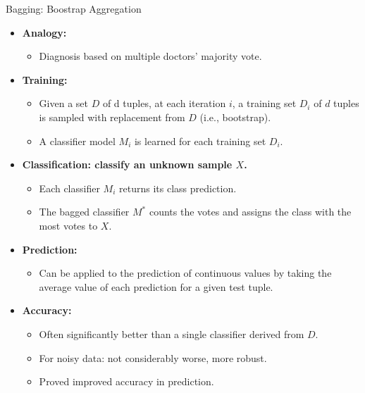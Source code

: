 \begin{frame}{Bagging: Boostrap Aggregation}
	\begin{itemize}
		\item \textbf{Analogy:}
		      \begin{itemize}
			      \item Diagnosis based on multiple doctors' majority vote.
		      \end{itemize}
		\item \textbf{Training:}
		      \begin{itemize}
			      \item Given a set $D$ of d tuples, at each iteration $i$, a training set $D_i$ of $d$ tuples is sampled with replacement from $D$ (i.e., bootstrap).
			      \item A classifier model $M_i$ is learned for each training set $D_i$.
		      \end{itemize}
		\item \textbf{Classification: classify an unknown sample $X$.}
		      \begin{itemize}
			      \item Each classifier $M_i$ returns its class prediction.
			      \item The bagged classifier $M^*$ counts the votes and assigns the class with the most votes to $X$.
		      \end{itemize}
		\item \textbf{Prediction:}
		      \begin{itemize}
			      \item Can be applied to the prediction of continuous values by taking the average value of each prediction for a given test tuple.
		      \end{itemize}
		\item \textbf{Accuracy:}
		      \begin{itemize}
			      \item Often significantly better than a single classifier derived from $D$.
			      \item For noisy data: not considerably worse, more robust.
			      \item Proved improved accuracy in prediction.
		      \end{itemize}
	\end{itemize}
\end{frame}

